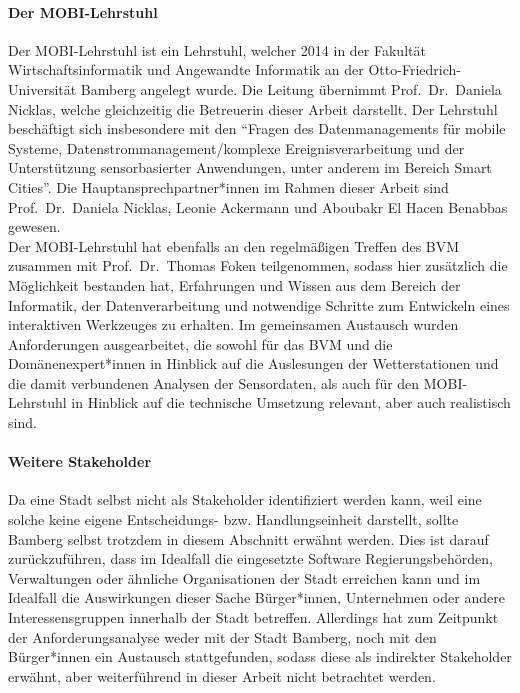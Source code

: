 \paragraph{Der \ac{MOBI-Lehrstuhl}}
Der \ac{MOBI-Lehrstuhl} ist ein Lehrstuhl, welcher 2014 in der Fakultät Wirtschaftsinformatik und Angewandte Informatik an der Otto-Friedrich-Universität Bamberg angelegt wurde. Die Leitung übernimmt Prof.\ Dr.\ Daniela Nicklas, welche gleichzeitig die Betreuerin dieser Arbeit darstellt. Der Lehrstuhl beschäftigt sich insbesondere mit den \enquote{Fragen des Datenmanagements für mobile Systeme, Datenstrommanagement/komplexe Ereignisverarbeitung und der Unterstützung sensorbasierter Anwendungen, unter anderem im Bereich Smart Cities}. Die Hauptansprechpartner*innen im Rahmen dieser Arbeit sind Prof.\ Dr.\ Daniela Nicklas, Leonie Ackermann und Aboubakr El Hacen Benabbas gewesen. \\ Der MOBI-Lehrstuhl hat ebenfalls an den regelmäßigen Treffen des \ac{BVM} zusammen mit Prof.\ Dr.\ Thomas Foken teilgenommen, sodass hier zusätzlich die Möglichkeit bestanden hat, Erfahrungen und Wissen aus dem Bereich der Informatik, der Datenverarbeitung und notwendige Schritte zum Entwickeln eines interaktiven Werkzeuges zu erhalten. Im gemeinsamen Austausch wurden Anforderungen ausgearbeitet, die sowohl für das \ac{BVM} und die Domänenexpert*innen in Hinblick auf die Auslesungen der Wetterstationen und die damit verbundenen Analysen der Sensordaten, als auch für den \ac{MOBI-Lehrstuhl} in Hinblick auf die technische Umsetzung relevant, aber auch realistisch sind.

\paragraph{Weitere Stakeholder}
Da eine Stadt selbst nicht als Stakeholder identifiziert werden kann, weil eine solche keine eigene Entscheidungs- bzw. Handlungseinheit darstellt, sollte Bamberg selbst trotzdem in diesem Abschnitt erwähnt werden. Dies ist darauf zurückzuführen, dass im Idealfall die eingesetzte Software Regierungsbehörden, Verwaltungen oder ähnliche Organisationen der Stadt erreichen kann und im Idealfall die Auswirkungen dieser Sache Bürger*innen, Unternehmen oder andere Interessensgruppen innerhalb der Stadt betreffen. Allerdings hat zum Zeitpunkt der Anforderungsanalyse weder mit der Stadt Bamberg, noch mit den Bürger*innen ein Austausch stattgefunden, sodass diese als indirekter Stakeholder erwähnt, aber weiterführend in dieser Arbeit nicht betrachtet werden.

